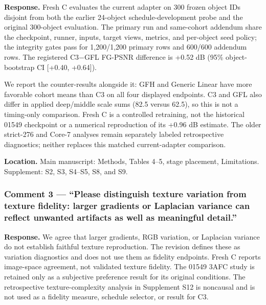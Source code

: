 \documentclass[
  10pt,
]{article}
\begin{document}
\textbf{Response.} Fresh C evaluates the current adapter on 300 frozen
object IDs disjoint from both the earlier 24-object schedule-development
probe and the original 300-object evaluation. The primary run and
same-cohort addendum share the checkpoint, runner, inputs, target views,
metrics, and per-object seed policy; the integrity gates pass for
1,200/1,200 primary rows and 600/600 addendum rows. The registered
C3−GFL FG-PSNR difference is +0.52 dB (95\% object-bootstrap CI
{[}+0.40, +0.64{]}).

We report the counter-results alongside it: GFH and Generic Linear have
more favorable cohort means than C3 on all four displayed endpoints. C3
and GFL also differ in applied deep/middle scale sums (82.5 versus
62.5), so this is not a timing-only comparison. Fresh C is a controlled
retraining, not the historical 01549 checkpoint or a numerical
reproduction of its +0.96 dB estimate. The older strict-276 and Core-7
analyses remain separately labeled retrospective diagnostics; neither
replaces this matched current-adapter comparison.

\textbf{Location.} Main manuscript: Methods, Tables 4--5, stage
placement, Limitations. Supplement: S2, S3, S4--S5, S8, and S9.

\hypertarget{comment-3-please-distinguish-texture-variation-from-texture-fidelity-larger-gradients-or-laplacian-variance-can-reflect-unwanted-artifacts-as-well-as-meaningful-detail.}{%
\subsubsection{Comment 3 --- ``Please distinguish texture variation from
texture fidelity: larger gradients or Laplacian variance can reflect
unwanted artifacts as well as meaningful
detail.''}\label{comment-3-please-distinguish-texture-variation-from-texture-fidelity-larger-gradients-or-laplacian-variance-can-reflect-unwanted-artifacts-as-well-as-meaningful-detail.}}

\textbf{Response.} We agree that larger gradients, RGB variation, or
Laplacian variance do not establish faithful texture reproduction. The
revision defines these as variation diagnostics and does not use them as
fidelity endpoints. Fresh C reports image-space agreement, not validated
texture fidelity. The 01549 3AFC study is retained only as a subjective
preference result for its original conditions. The retrospective
texture-complexity analysis in Supplement S12 is noncausal and is not
used as a fidelity measure, schedule selector, or result for C3.
\end{document}
